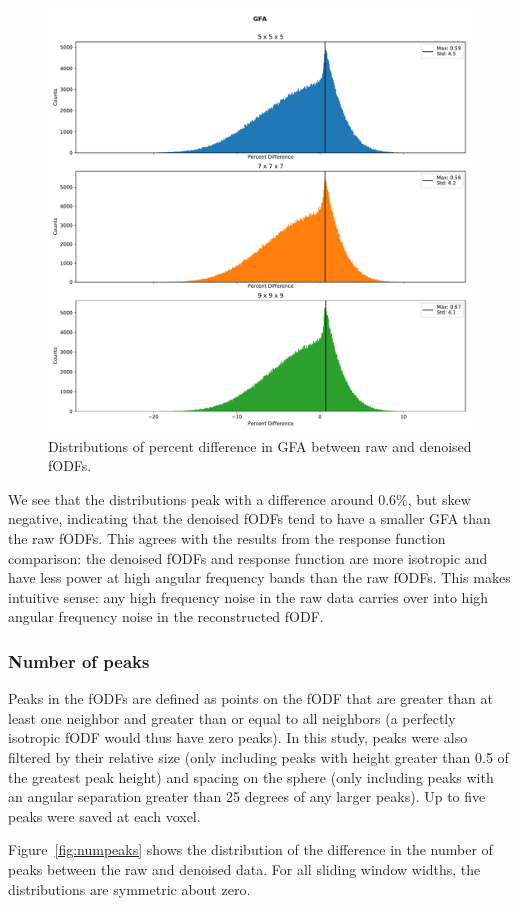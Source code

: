 \documentclass{article}
\begin{document}
\begin{figure}[H]
  \centering
  \includegraphics[width=0.6\linewidth]{../figs/gfa}
  \captionsetup{width=0.6\linewidth}
  \caption{Distributions of percent difference in GFA between raw and denoised fODFs.}
  \label{fig:gfa}
\end{figure}

We see that the distributions peak with a difference around 0.6\%, but skew
negative, indicating that the denoised fODFs tend to have a smaller GFA than the
raw fODFs. This agrees with the results from the response function comparison:
the denoised fODFs and response function are more isotropic and have less power
at high angular frequency bands than the raw fODFs. This makes intuitive sense:
any high frequency noise in the raw data carries over into high angular
frequency noise in the reconstructed fODF.

\subsubsection{Number of peaks}
Peaks in the fODFs are defined as points on the fODF that are greater than at
least one neighbor and greater than or equal to all neighbors (a perfectly
isotropic fODF would thus have zero peaks). In this study, peaks were also
filtered by their relative size (only including peaks with height greater than
0.5 of the greatest peak height) and spacing on the sphere (only including peaks
with an angular separation greater than 25 degrees of any larger
peaks). Up to five peaks were saved at each voxel. 

Figure~\ref{fig:numpeaks} shows the distribution of the difference in the number
of peaks between the raw and denoised data. For all sliding window widths, the
distributions are symmetric about zero.
\end{document}

